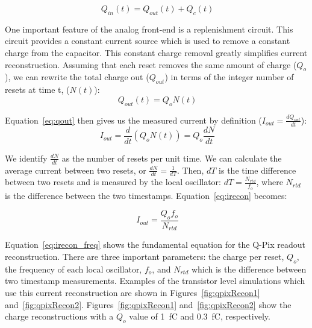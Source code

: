 \begin{equation}~\label{eq:qin}
Q_{in}(t) = Q_{out}(t) + Q_{c}(t)
\end{equation}

One important feature of the analog front-end is a replenishment circuit.
This circuit provides a constant current source which is used to remove a constant charge from the capacitor.
This constant charge removal greatly simplifies current reconstruction.
Assuming that each reset removes the same amount of charge ($Q_{o}$), we can rewrite the total charge out ($Q_{out}$) in terms of the integer number of resets at time t, ($N(t)$):
\begin{equation}~\label{eq:qout}
Q_{out}(t) = Q_{o} N(t)
\end{equation}

Equation~\ref{eq:qout} then gives us the measured current by definition ($I_{out} = \frac{dQ_{out}}{dt}$):
\begin{equation}~\label{eq:irecon}
I_{out} = \frac{d}{dt}(Q_{o}N(t)) = Q_{o}\frac{dN}{dt}
\end{equation}

We identify $\frac{dN}{dt}$ as the number of resets per unit time.
We can calculate the average current between two resets, or $\frac{dN}{dt} = \frac{1}{dT}$.
Then, $dT$ is the time difference between two resets and is measured by the local oscillator: $dT = \frac{N_{rtd}}{f_{o}}$, where $N_{rtd}$ is the difference between the two timestamps.
Equation~\ref{eq:irecon} becomes:

\begin{equation}~\label{eq:irecon_freq}
\boxed{I_{out} = \frac{Q_{o}f_{o}}{N_{rtd}}}
\end{equation}

Equation~\ref{eq:irecon_freq} shows the fundamental equation for the Q-Pix readout reconstruction.
There are three important parameters: the charge per reset, $Q_{o}$, the frequency of each local oscillator, $f_{o}$, and $N_{rtd}$ which is the difference between two timestamp measurements.
Examples of the transistor level simulations which use this current reconstruction are shown in Figures~\ref{fig:qpixRecon1} and~\ref{fig:qpixRecon2}.
Figures~\ref{fig:qpixRecon1} and~\ref{fig:qpixRecon2} show the charge reconstructions with a $Q_{o}$ value of 1~\unit{fC} and 0.3~\unit{fC}, respectively.

